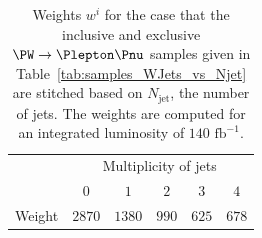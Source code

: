 \documentclass[twocolumn,epjc3]{svjour3}
\newcommand{\jet}{\ensuremath{\textrm{jet}}\xspace}
\newcommand{\fbinv}{\ensuremath{\textrm{~fb}^{-1}}\xspace}
\begin{document}
\begin{table}
\caption{
  Weights $w^{i}$ for the case that the inclusive and exclusive $\PW \to \Plepton\Pnu$ samples 
  given in Table~\ref{tab:samples_WJets_vs_Njet}
  are stitched based on $N_{\jet}$, the number of jets.
  The weights are computed for an integrated luminosity of $140\fbinv$.
}
\label{tab:weights_WJets_vs_Njet}
\begin{center}
\begin{tabular}{l|ccccc}
\hline
 & \multicolumn{5}{c}{Multiplicity of jets} \\
 & $0$ & $1$ & $2$ & $3$ & $4$ \\
\hline
Weight & $2870$ & $1380$ & $990$ & $625$ & $678$ \\
\hline
\end{tabular}
\end{center}
\end{table}

\end{document}
